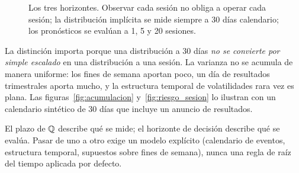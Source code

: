 \begin{figure}[H]
\centering
\resizebox{\linewidth}{!}{}
\caption{Los tres horizontes. Observar cada sesión no obliga a operar cada sesión; la distribución
implícita se mide siempre a 30 días calendario; los pronósticos se evalúan a 1, 5 y 20 sesiones.}
\label{fig:horizontes}
\end{figure}

La distinción importa porque una distribución a 30 días \emph{no se convierte por simple escalado} en
una distribución a una sesión. La varianza no se acumula de manera uniforme: los fines de semana
aportan poco, un día de resultados trimestrales aporta mucho, y la estructura temporal de
volatilidades rara vez es plana. Las figuras~\ref{fig:acumulacion} y~\ref{fig:riesgo_sesion}
lo ilustran con un calendario sintético de 30 días que incluye un anuncio de resultados.



\begin{ideaclave}
El plazo de $\mathbb{Q}$ describe qué se mide; el horizonte de decisión describe qué se evalúa. Pasar de uno a
otro exige un modelo explícito (calendario de eventos, estructura temporal, supuestos sobre fines de
semana), nunca una regla de raíz del tiempo aplicada por defecto.
\end{ideaclave}
